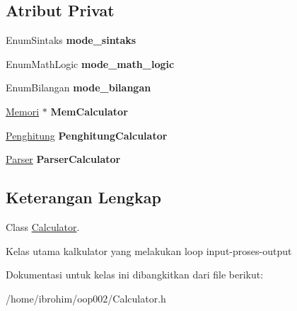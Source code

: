 \subsection*{Atribut Privat}
\begin{DoxyCompactItemize}
\item 
\hypertarget{classCalculator_af5a98c29c60690750f97c37cda9c41ed}{}Enum\+Sintaks {\bfseries mode\+\_\+sintaks}\label{classCalculator_af5a98c29c60690750f97c37cda9c41ed}

\item 
\hypertarget{classCalculator_a1824524274d28e32d9c2ccff6dc3bfd8}{}Enum\+Math\+Logic {\bfseries mode\+\_\+math\+\_\+logic}\label{classCalculator_a1824524274d28e32d9c2ccff6dc3bfd8}

\item 
\hypertarget{classCalculator_a1c1a167d6c9d55e2a304feb4762dc3fd}{}Enum\+Bilangan {\bfseries mode\+\_\+bilangan}\label{classCalculator_a1c1a167d6c9d55e2a304feb4762dc3fd}

\item 
\hypertarget{classCalculator_a2a6e5d099b3c304fc7976807e32a8bfd}{}\hyperlink{classMemori}{Memori} $\ast$ {\bfseries Mem\+Calculator}\label{classCalculator_a2a6e5d099b3c304fc7976807e32a8bfd}

\item 
\hypertarget{classCalculator_a9aa748998699f5f3db482035302c78d9}{}\hyperlink{classPenghitung}{Penghitung} {\bfseries Penghitung\+Calculator}\label{classCalculator_a9aa748998699f5f3db482035302c78d9}

\item 
\hypertarget{classCalculator_a5f5c32620da0500ae0abac5e210c3520}{}\hyperlink{classParser}{Parser} {\bfseries Parser\+Calculator}\label{classCalculator_a5f5c32620da0500ae0abac5e210c3520}

\end{DoxyCompactItemize}


\subsection{Keterangan Lengkap}
Class \hyperlink{classCalculator}{Calculator}. 

Kelas utama kalkulator yang melakukan loop input-\/proses-\/output 

Dokumentasi untuk kelas ini dibangkitkan dari file berikut\+:\begin{DoxyCompactItemize}
\item 
/home/ibrohim/oop002/Calculator.\+h\end{DoxyCompactItemize}
